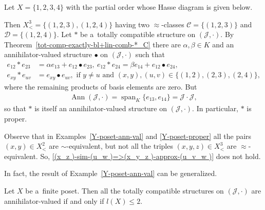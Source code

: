 \documentclass{jonasart}
\newcommand{\af}{\alpha}
\newcommand{\bl}{\bullet}
\newcommand{\bt}{\beta}
\newcommand{\C}{\mathcal{C}}
\newcommand{\D}{\mathcal{D}}
\newcommand{\J}{\mathcal{J}}
\DeclareMathOperator{\Ann}{Ann}
\DeclareMathOperator{\spn}{span}
\begin{document}
	\begin{example}\label{Y-poset-ann-val}
		Let $X=\{1,2,3,4\}$ with the partial order whose Hasse diagram is given below.
		\begin{center}
		\end{center}
		Then $X^3_< =\{(1,2,3),(1,2,4)\}$ having two $\approx$-classes $\C=\{(1,2,3)\}$ and $\D=\{(1,2,4)\}$. Let $*$ be a~totally compatible structure on $(\J,\cdot)$. By Theorem~\ref{tot-comp-exactly-bl+lin-comb-*_C} there are $\af,\bt\in K$ and an annihilator-valued structure $\bl$ on $(\J,\cdot)$ such that
		\begin{align*}
			e_{12}*e_{23}&=\af e_{13}+e_{12}\bl e_{23},\ e_{12}*e_{24}=\bt e_{14}+e_{12}\bl e_{24},\\
			e_{xy}*e_{uv}&=e_{xy}\bl e_{uv}, \text{ if }y\ne u\text{ and }(x,y),(u,v)\in\{(1,2),(2,3),(2,4)\},
		\end{align*}
		where the remaining products of basis elements are zero. But
		\begin{align*}
			\Ann(\J,\cdot)=\spn_K\{e_{13},e_{14}\}=\J\cdot \J,
		\end{align*}
		so that $*$ is itself an annihilator-valued structure on $(\J,\cdot)$. In particular, $*$ is proper.
	\end{example}

	\begin{remark}
		Observe that in Examples~\ref{Y-poset-ann-val} and \ref{Y-poset-proper} all the pairs $(x,y)\in X^2_<$ are $\sim$-equivalent, but not all the triples $(x,y,z)\in X^3_<$ are $\approx$-equivalent. So, \eqref{(x_z )-sim-(u_w )=>(x_y_z )-approx-(u_v_w )} does not hold.
	\end{remark}

	In fact, the result of Example~\ref{Y-poset-ann-val} can be generalized.

	\begin{proposition}\label{all-tot-comp-ann-val<=>l(X)<=2}
		Let $X$ be a~finite poset. Then all the totally compatible structures on $(\J,\cdot)$ are annihilator-valued if and only if $l(X)\le 2$.
	\end{proposition}
\end{document}
